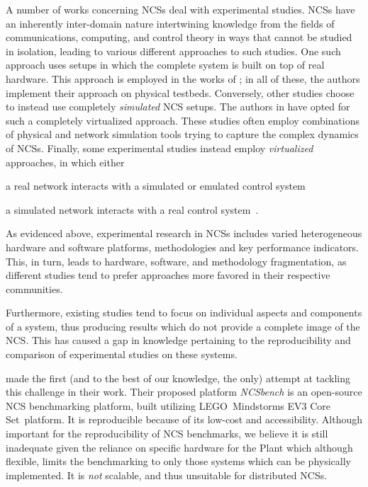 A number of works concerning \acp{NCS} deal with experimental studies.
\acp{NCS} have an inherently inter-domain nature intertwining knowledge from the fields of communications, computing, and control theory in ways that cannot be studied in isolation, leading to various different approaches to such studies.
One such approach uses setups in which the complete system is built on top of real hardware.
This approach is employed in the works of  \textcite{Baumann2018LowPower,Cuenca2019UAV}; in all of these, the authors implement their approach on physical testbeds.
Conversely, other studies choose to instead use completely \emph{simulated} \ac{NCS} setups. The authors in \cite{Ma2019DynamicSched} have opted for such a completely virtualized approach. These studies often employ combinations of physical and network simulation tools trying to capture the complex dynamics of \acp{NCS}.
Finally, some experimental studies instead employ \emph{virtualized} approaches, in which either
\begin{enumerate*}[itemjoin={{; }}, itemjoin*={{; or }}]
    \item a real network interacts with a simulated or emulated control system~\cite{Wang2020VoltageControl}
    \item a simulated network interacts with a real control system~\cite{Natale2004InvPendEthernet}.
\end{enumerate*}

As evidenced above, experimental research in \acp{NCS} includes varied heterogeneous hardware and software platforms, methodologies and key performance indicators.
This, in turn, leads to hardware, software, and methodology fragmentation, as different studies tend to prefer approaches more favored in their respective communities.

Furthermore, existing studies tend to focus on individual aspects and components of a system, thus producing results which do not provide a complete image of the \ac{NCS}.
This has caused a gap in knowledge pertaining to the reproducibility and comparison of experimental studies on these systems.

\textcite{Zoppi2020NCSBench} made the first (and to the best of our knowledge, the only) attempt at tackling this challenge in their work.
Their proposed platform \emph{NCSbench} is an open-source \ac{NCS} benchmarking platform, built utilizing LEGO\textregistered{}\ Mindstorms EV3 Core Set\texttrademark{}\ platform. It is reproducible because of its low-cost and accessibility. Although important for the reproducibility of \ac{NCS} benchmarks, we believe it is still inadequate given the reliance on specific hardware for the Plant which although flexible, limits the benchmarking to only those systems which can be physically implemented.
It is \emph{not} scalable, and thus unsuitable for distributed \acp{NCS}.

